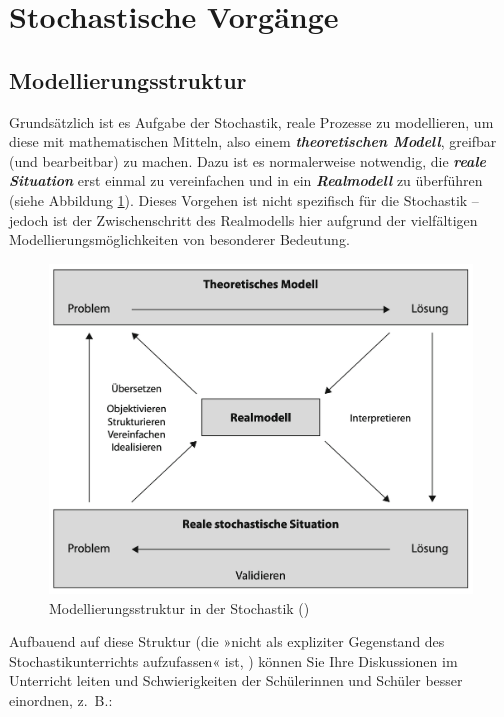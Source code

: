 \documentclass[
]{scrbook}
\theoremstyle{definition}
\theoremstyle{definition}
\theoremstyle{definition}
\theoremstyle{definition}
\theoremstyle{remark}
\begin{document}
\section{Stochastische Vorgänge}\label{stochastische-vorguxe4nge}

\subsection{Modellierungsstruktur}\label{modellierungsstruktur}

Grundsätzlich ist es Aufgabe der Stochastik, reale Prozesse zu modellieren, um diese mit mathematischen Mitteln, also einem \textbf{\emph{theoretischen Modell}}, greifbar (und bearbeitbar) zu machen. Dazu ist es normalerweise notwendig, die \textbf{\emph{reale Situation}} erst einmal zu vereinfachen und in ein \textbf{\emph{Realmodell}} zu überführen (siehe Abbildung \ref{fig:Modelle}). Dieses Vorgehen ist nicht spezifisch für die Stochastik -- jedoch ist der Zwischenschritt des Realmodells hier aufgrund der vielfältigen Modellierungsmöglichkeiten von besonderer Bedeutung.



\begin{figure}

{\centering \includegraphics[width=0.75\linewidth]{pictures/12-Modelle} 

}

\caption{Modellierungsstruktur in der Stochastik ()}\label{fig:Modelle}
\end{figure}

Aufbauend auf diese Struktur (die »nicht als expliziter Gegenstand des Stochastikunterrichts aufzufassen« ist, ) können Sie Ihre Diskussionen im Unterricht leiten und Schwierigkeiten der Schülerinnen und Schüler besser einordnen, z.~B.:
\end{document}

